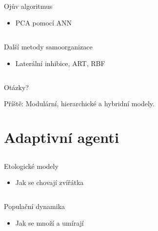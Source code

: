 \documentclass{beamer}
\begin{document}
\subsection{}
\begin{frame}{Ojův algoritmus}
\begin{itemize}
\item PCA pomocí ANN
\end{itemize}
\end{frame}

\subsection{}
\begin{frame}{Další metody samoorganizace}
\begin{itemize}
\item Laterální inhibice, ART, RBF
\end{itemize}
\end{frame}

\subsection{}
\begin{frame}{Otázky?}
\begin{center}
Příště: Modulární, hierarchické a hybridní modely.
\end{center}
\end{frame}

\section{Adaptivní agenti}

\subsection{}
\begin{frame}{Etologické modely}
\begin{itemize}
\item Jak se chovají zvířátka
\end{itemize}
\end{frame}

\subsection{}
\begin{frame}{Populační dynamika}
\begin{itemize}
\item Jak se množí a umírají
\end{itemize}
\end{frame}
\end{document}
